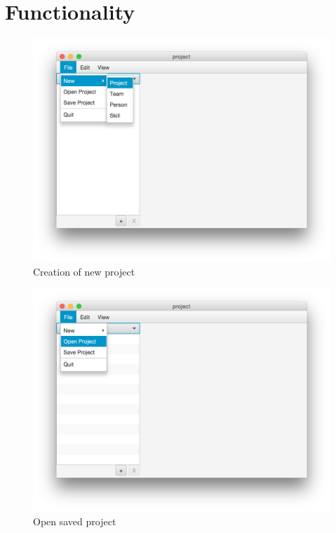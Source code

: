 \section{Functionality}

\begin{figure}[H]
\centering
\includegraphics[width=\textwidth]{images/screenshots/screenshot1.png}
\caption{Creation of new project}
\label{fig:new_project}
\end{figure}

\begin{figure}[H]
\centering
\includegraphics[width=\textwidth]{images/screenshots/screenshot2.png}
\caption{Open saved project}
\label{fig:open_project}
\end{figure}

